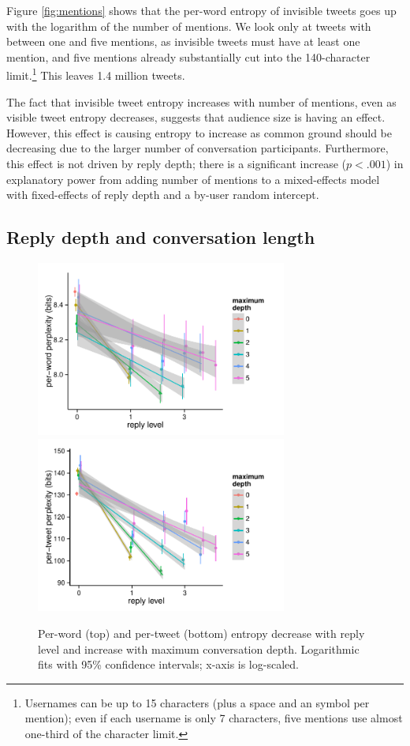 \documentclass[11pt,letterpaper]{article}
\begin{document}
Figure \ref{fig:mentions} shows that the per-word entropy of invisible tweets goes up with the logarithm of the number of mentions.   We look only at tweets with between one and five mentions, as invisible tweets must have at least one mention, and five mentions already substantially cut into the 140-character limit.\footnote{Usernames can be up to 15 characters (plus a space and an \@ symbol per mention); even if each username is only 7 characters, five mentions use almost one-third of the character limit.}  This leaves 1.4 million tweets.

The fact that invisible tweet entropy increases with number of mentions, even as visible tweet entropy decreases, suggests that audience size is having an effect.  However, this effect is causing entropy to increase as common ground should be decreasing due to the larger number of conversation participants.  Furthermore, this effect is not driven by reply depth; there is a significant increase ($p < .001$) in explanatory power from adding number of mentions to a mixed-effects model with fixed-effects of reply depth and a by-user random intercept.

\subsection{Reply depth and conversation length}

\begin{figure}[t]
 \centering
  \includegraphics[width=3.25in]{figures/cmcl-rlevel-pw.pdf}\vspace*{-.3em}
  \includegraphics[width=3.25in]{figures/cmcl-rlevel-pt.pdf}\vspace*{-.3em}
 \caption{Per-word (top) and per-tweet (bottom) entropy decrease with reply level and increase with maximum conversation depth.  Logarithmic fits with 95\% confidence intervals; x-axis is log-scaled.}\label{fig:rlevel-maxdesc}\vspace*{-.5em}
\end{figure}
\end{document}
